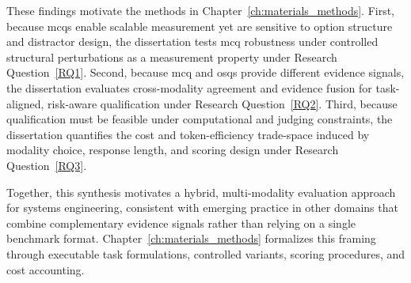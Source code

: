 These findings motivate the methods in Chapter~\ref{ch:materials_methods}. First, because \acp{mcq} enable scalable measurement yet are sensitive to option structure and distractor design, the dissertation tests \ac{mcq} robustness under controlled structural perturbations as a measurement property under Research Question~\ref{RQ1}. Second, because \ac{mcq} and \acp{osq} provide different evidence signals, the dissertation evaluates cross-modality agreement and evidence fusion for task-aligned, risk-aware qualification under Research Question~\ref{RQ2}. Third, because qualification must be feasible under computational and judging constraints, the dissertation quantifies the cost and token-efficiency trade-space induced by modality choice, response length, and scoring design under Research Question~\ref{RQ3}.

Together, this synthesis motivates a hybrid, multi-modality evaluation approach for systems engineering, consistent with emerging practice in other domains that combine complementary evidence signals rather than relying on a single benchmark format. Chapter~\ref{ch:materials_methods} formalizes this framing through executable task formulations, controlled variants, scoring procedures, and cost accounting.

